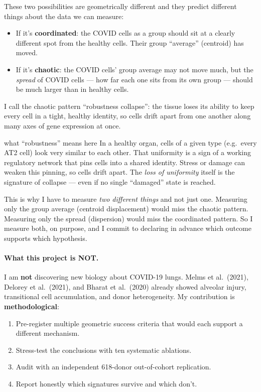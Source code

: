 \documentclass[11pt]{article}
\begin{document}
These two possibilities are geometrically different and they predict different
things about the data we can measure:

\begin{itemize}
\item If it's \textbf{coordinated}: the COVID cells as a group should sit at a
      clearly different spot from the healthy cells. Their group ``average''
      (centroid) has moved.
\item If it's \textbf{chaotic}: the COVID cells' group average may not move much,
      but the \emph{spread} of COVID cells --- how far each one sits from its
      own group --- should be much larger than in healthy cells.
\end{itemize}

I call the chaotic pattern ``robustness collapse'': the tissue loses its ability
to keep every cell in a tight, healthy identity, so cells drift apart from one
another along many axes of gene expression at once.

\begin{jargon}{what ``robustness'' means here}
In a healthy organ, cells of a given type (e.g.\ every AT2 cell) look very
similar to each other. That uniformity is a sign of a working regulatory
network that pins cells into a shared identity. Stress or damage can weaken
this pinning, so cells drift apart. The \emph{loss of uniformity} itself is
the signature of collapse --- even if no single ``damaged'' state is reached.
\end{jargon}

\begin{whyblock}
This is why I have to measure \emph{two different things} and not just one.
Measuring only the group average (centroid displacement) would miss the chaotic
pattern. Measuring only the spread (dispersion) would miss the coordinated
pattern. So I measure both, on purpose, and I commit to declaring in advance
which outcome supports which hypothesis.
\end{whyblock}

\paragraph{What this project is NOT.}
I am \textbf{not} discovering new biology about COVID-19 lungs.
Melms et al.\ (2021), Delorey et al.\ (2021), and Bharat et al.\ (2020) already
showed alveolar injury, transitional cell accumulation, and donor heterogeneity.
My contribution is \textbf{methodological}:
\begin{enumerate}
\item Pre-register multiple geometric success criteria that would each support
      a different mechanism.
\item Stress-test the conclusions with ten systematic ablations.
\item Audit with an independent 618-donor out-of-cohort replication.
\item Report honestly which signatures survive and which don't.
\end{enumerate}
\end{document}

